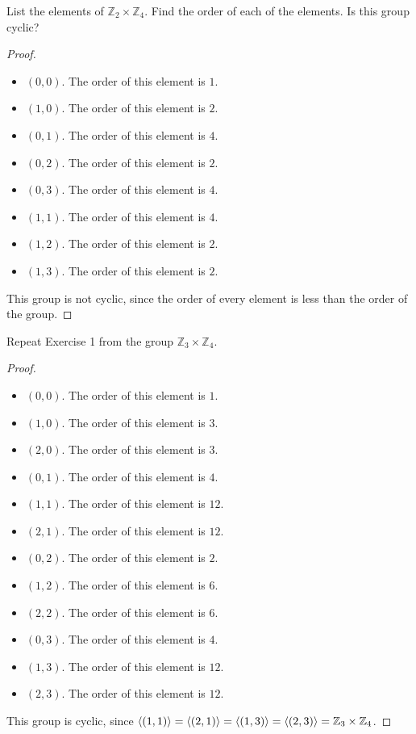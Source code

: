 \begin{exercise}
    List the elements of $\mathbb{Z}_{2}\times\mathbb{Z}_{4}$. Find the order of each of the elements. Is this group cyclic?
\end{exercise}

\begin{proof}
    \begin{itemize}
        \item $(0, 0)$. The order of this element is $1$.
        \item $(1, 0)$. The order of this element is $2$.
        \item $(0, 1)$. The order of this element is $4$.
        \item $(0, 2)$. The order of this element is $2$.
        \item $(0, 3)$. The order of this element is $4$.
        \item $(1, 1)$. The order of this element is $4$.
        \item $(1, 2)$. The order of this element is $2$.
        \item $(1, 3)$. The order of this element is $2$.
    \end{itemize}

    This group is not cyclic, since the order of every element is less than the order of the group.
\end{proof}

\begin{exercise}
    Repeat Exercise 1 from the group $\mathbb{Z}_{3}\times\mathbb{Z}_{4}$.
\end{exercise}

\begin{proof}
    \begin{itemize}
        \item $(0, 0)$. The order of this element is $1$.
        \item $(1, 0)$. The order of this element is $3$.
        \item $(2, 0)$. The order of this element is $3$.
        \item $(0, 1)$. The order of this element is $4$.
        \item $(1, 1)$. The order of this element is $12$.
        \item $(2, 1)$. The order of this element is $12$.
        \item $(0, 2)$. The order of this element is $2$.
        \item $(1, 2)$. The order of this element is $6$.
        \item $(2, 2)$. The order of this element is $6$.
        \item $(0, 3)$. The order of this element is $4$.
        \item $(1, 3)$. The order of this element is $12$.
        \item $(2, 3)$. The order of this element is $12$.
    \end{itemize}

    This group is cyclic, since $\left\langle{(1,1)}\right\rangle = \left\langle{(2,1)}\right\rangle = \left\langle{(1,3)}\right\rangle = \left\langle{(2,3)}\right\rangle = \mathbb{Z}_{3}\times\mathbb{Z}_{4}$.
\end{proof}


